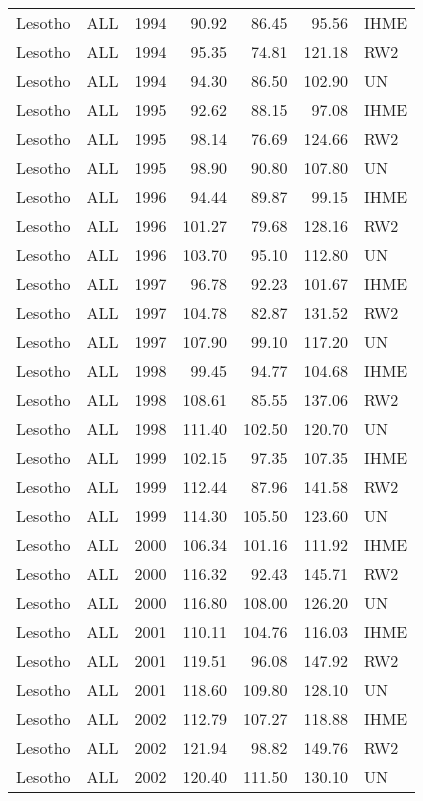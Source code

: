 \begin{longtable}{lllrrrl}
  Lesotho & ALL & 1994 & 90.92 & 86.45 & 95.56 & IHME \\ 
  Lesotho & ALL & 1994 & 95.35 & 74.81 & 121.18 & RW2 \\ 
  Lesotho & ALL & 1994 & 94.30 & 86.50 & 102.90 & UN \\ 
  Lesotho & ALL & 1995 & 92.62 & 88.15 & 97.08 & IHME \\ 
  Lesotho & ALL & 1995 & 98.14 & 76.69 & 124.66 & RW2 \\ 
  Lesotho & ALL & 1995 & 98.90 & 90.80 & 107.80 & UN \\ 
  Lesotho & ALL & 1996 & 94.44 & 89.87 & 99.15 & IHME \\ 
  Lesotho & ALL & 1996 & 101.27 & 79.68 & 128.16 & RW2 \\ 
  Lesotho & ALL & 1996 & 103.70 & 95.10 & 112.80 & UN \\ 
  Lesotho & ALL & 1997 & 96.78 & 92.23 & 101.67 & IHME \\ 
  Lesotho & ALL & 1997 & 104.78 & 82.87 & 131.52 & RW2 \\ 
  Lesotho & ALL & 1997 & 107.90 & 99.10 & 117.20 & UN \\ 
  Lesotho & ALL & 1998 & 99.45 & 94.77 & 104.68 & IHME \\ 
  Lesotho & ALL & 1998 & 108.61 & 85.55 & 137.06 & RW2 \\ 
  Lesotho & ALL & 1998 & 111.40 & 102.50 & 120.70 & UN \\ 
  Lesotho & ALL & 1999 & 102.15 & 97.35 & 107.35 & IHME \\ 
  Lesotho & ALL & 1999 & 112.44 & 87.96 & 141.58 & RW2 \\ 
  Lesotho & ALL & 1999 & 114.30 & 105.50 & 123.60 & UN \\ 
  Lesotho & ALL & 2000 & 106.34 & 101.16 & 111.92 & IHME \\ 
  Lesotho & ALL & 2000 & 116.32 & 92.43 & 145.71 & RW2 \\ 
  Lesotho & ALL & 2000 & 116.80 & 108.00 & 126.20 & UN \\ 
  Lesotho & ALL & 2001 & 110.11 & 104.76 & 116.03 & IHME \\ 
  Lesotho & ALL & 2001 & 119.51 & 96.08 & 147.92 & RW2 \\ 
  Lesotho & ALL & 2001 & 118.60 & 109.80 & 128.10 & UN \\ 
  Lesotho & ALL & 2002 & 112.79 & 107.27 & 118.88 & IHME \\ 
  Lesotho & ALL & 2002 & 121.94 & 98.82 & 149.76 & RW2 \\ 
  Lesotho & ALL & 2002 & 120.40 & 111.50 & 130.10 & UN \\ 

\end{longtable}
